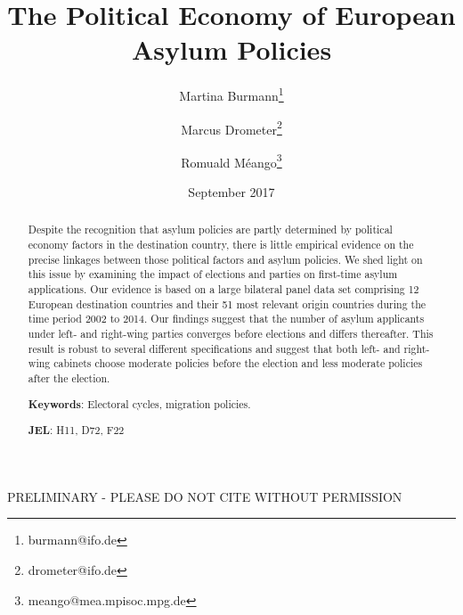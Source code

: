 \documentclass[a4paper,12pt]{article}
\title{The Political Economy of European Asylum Policies}
\date{September 2017}
\author[,1]{Martina Burmann\thanks{burmann@ifo.de}}
\author[,1]{Marcus Drometer\thanks{drometer@ifo.de}}
\author[,2]{Romuald M\'eango\thanks{meango@mea.mpisoc.mpg.de}}
\affil[1]{ifo Institute for Economic Research, Munich}
\affil[2]{Munich Center for the Economics of Aging (MEA)}
\begin{document}
      \maketitle

\begin{center}
PRELIMINARY - PLEASE DO NOT CITE WITHOUT PERMISSION
\end{center}
\begin{abstract}
\singlespacing
\noindent 
Despite the recognition that asylum policies are partly determined by political economy factors in the destination country, there is little empirical evidence on the precise linkages between those political factors and asylum policies. We shed light on this issue by examining the impact of elections and parties on first-time asylum applications.  Our evidence is based on a large bilateral panel data set comprising 12 European destination countries and their 51 most relevant origin countries during the time period 2002 to 2014. Our findings suggest that  the number of asylum applicants under left- and right-wing parties converges before elections and differs thereafter. This result is robust to several different specifications and suggest that both left- and right-wing cabinets choose moderate policies before the election and less moderate policies after the election.

\bigskip

\textbf{Keywords}: Electoral cycles, migration policies.

\textbf{JEL}: H11, D72, F22

\bigskip
\end{abstract}
\setcounter{page}{0} \renewcommand{\thepage}{}
\pagebreak{}\pagebreak

\end{document}
